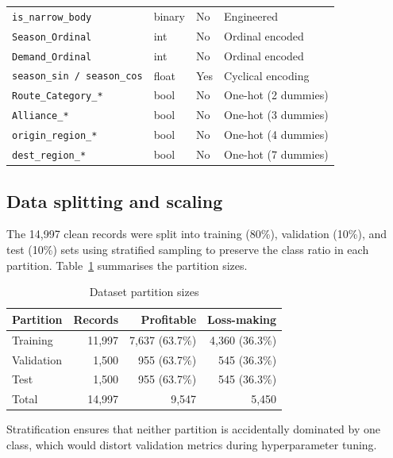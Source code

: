 \documentclass[12pt,a4paper]{article}
\begin{document}
\begin{longtable}{L{4.2cm} C{1.6cm} C{1.6cm} L{5.2cm}}
  \texttt{is\_narrow\_body}      & binary & No & Engineered \\
  \texttt{Season\_Ordinal}       & int   & No  & Ordinal encoded \\
  \texttt{Demand\_Ordinal}       & int   & No  & Ordinal encoded \\
  \texttt{season\_sin / season\_cos} & float & Yes & Cyclical encoding \\
  \texttt{Route\_Category\_*}    & bool  & No  & One-hot (2 dummies) \\
  \texttt{Alliance\_*}           & bool  & No  & One-hot (3 dummies) \\
  \texttt{origin\_region\_*}     & bool  & No  & One-hot (4 dummies) \\
  \texttt{dest\_region\_*}       & bool  & No  & One-hot (7 dummies) \\
\end{longtable}

\subsection{Data splitting and scaling}
\label{subsec:splitting}

The 14,997 clean records were split into training (80\%), validation (10\%), and test (10\%) sets using stratified sampling to preserve the class ratio in each partition. Table~\ref{tab:splits} summarises the partition sizes.

\begin{table}[H]
  \centering
  \caption{Dataset partition sizes}
  \label{tab:splits}
  \begin{tabular}{lrrr}
    \toprule
    \textbf{Partition} & \textbf{Records} & \textbf{Profitable} & \textbf{Loss-making} \\
    \midrule
    Training   & 11,997 & 7,637 (63.7\%) & 4,360 (36.3\%) \\
    Validation & 1,500  & 955   (63.7\%) & 545   (36.3\%) \\
    Test       & 1,500  & 955   (63.7\%) & 545   (36.3\%) \\
    \midrule
    Total      & 14,997 & 9,547 & 5,450 \\
    \bottomrule
  \end{tabular}
\end{table}

Stratification ensures that neither partition is accidentally dominated by one class, which would distort validation metrics during hyperparameter tuning.
\end{document}
